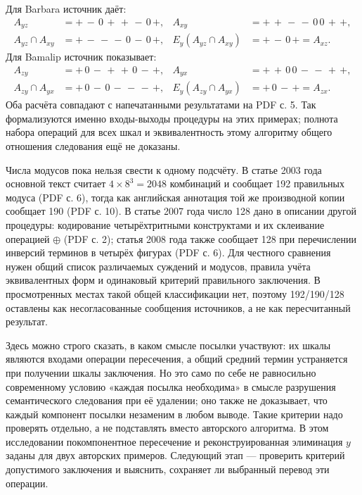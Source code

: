 \documentclass[12pt,a4paper]{article}
\begin{document}
Для Barbara источник даёт:
\[
\begin{aligned}
A_{yz}&=+\,-\,0\,+\,+\,-\,0\,+, &
A_{xy}&=+\,+\,-\,-\,0\,0\,+\,+,\\
A_{yz}\cap A_{xy}&=+\,-\,-\,-\,0\,-\,0\,+, &
E_y(A_{yz}\cap A_{xy})&=+\,-\,0\,+ = A_{xz}.
\end{aligned}
\]
Для Bamalip источник показывает:
\[
\begin{aligned}
A_{zy}&=+\,0\,-\,+\,+\,0\,-\,+, &
A_{yx}&=+\,+\,0\,0\,-\,-\,+\,+,\\
A_{zy}\cap A_{yx}&=+\,0\,-\,0\,-\,-\,-\,+, &
E_y(A_{zy}\cap A_{yx})&=+\,0\,-\,+ = A_{zx}.
\end{aligned}
\]
Оба расчёта совпадают с напечатанными результатами на PDF с. 5. Так формализуются именно входы-выходы процедуры на этих примерах; полнота набора операций для всех шкал и эквивалентность этому алгоритму общего отношения следования ещё не доказаны.

Числа модусов пока нельзя свести к одному подсчёту. В статье 2003 года основной текст считает \(4\times8^3=2048\) комбинаций и сообщает 192 правильных модуса (PDF с. 6), тогда как английская аннотация той же производной копии сообщает 190 (PDF с. 10). В статье 2007 года число 128 дано в описании другой процедуры: кодирование четырёхтритными конструктами и их склеивание операцией \(\oplus\) (PDF с. 2); статья 2008 года также сообщает 128 при перечислении инверсий терминов в четырёх фигурах (PDF с. 6). Для честного сравнения нужен общий список различаемых суждений и модусов, правила учёта эквивалентных форм и одинаковый критерий правильного заключения. В просмотренных местах такой общей классификации нет, поэтому 192/190/128 оставлены как несогласованные сообщения источников, а не как пересчитанный результат.


Здесь можно строго сказать, в каком смысле посылки участвуют: их шкалы являются входами операции пересечения, а общий средний термин устраняется при получении шкалы заключения. Но это само по себе не равносильно современному условию «каждая посылка необходима» в смысле разрушения семантического следования при её удалении; оно также не доказывает, что каждый компонент посылки незаменим в любом выводе. Такие критерии надо проверять отдельно, а не подставлять вместо авторского алгоритма. В этом исследовании покомпонентное пересечение и реконструированная элиминация \(y\) заданы для двух авторских примеров. Следующий этап — проверить критерий допустимого заключения и выяснить, сохраняет ли выбранный перевод эти операции.
\end{document}
